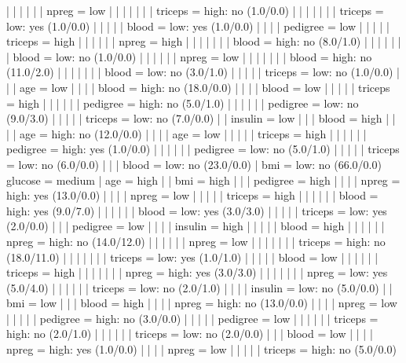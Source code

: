 |   |   |   |   |   |   npreg = low
|   |   |   |   |   |   |   triceps = high: no (1.0/0.0)
|   |   |   |   |   |   |   triceps = low: yes (1.0/0.0)
|   |   |   |   |   blood = low: yes (1.0/0.0)
|   |   |   |   pedigree = low
|   |   |   |   |   triceps = high
|   |   |   |   |   |   npreg = high
|   |   |   |   |   |   |   blood = high: no (8.0/1.0)
|   |   |   |   |   |   |   blood = low: no (1.0/0.0)
|   |   |   |   |   |   npreg = low
|   |   |   |   |   |   |   blood = high: no (11.0/2.0)
|   |   |   |   |   |   |   blood = low: no (3.0/1.0)
|   |   |   |   |   triceps = low: no (1.0/0.0)
|   |   |   age = low
|   |   |   |   blood = high: no (18.0/0.0)
|   |   |   |   blood = low
|   |   |   |   |   triceps = high
|   |   |   |   |   |   pedigree = high: no (5.0/1.0)
|   |   |   |   |   |   pedigree = low: no (9.0/3.0)
|   |   |   |   |   triceps = low: no (7.0/0.0)
|   |   insulin = low
|   |   |   blood = high
|   |   |   |   age = high: no (12.0/0.0)
|   |   |   |   age = low
|   |   |   |   |   triceps = high
|   |   |   |   |   |   pedigree = high: yes (1.0/0.0)
|   |   |   |   |   |   pedigree = low: no (5.0/1.0)
|   |   |   |   |   triceps = low: no (6.0/0.0)
|   |   |   blood = low: no (23.0/0.0)
|   bmi = low: no (66.0/0.0)
glucose = medium
|   age = high
|   |   bmi = high
|   |   |   pedigree = high
|   |   |   |   npreg = high: yes (13.0/0.0)
|   |   |   |   npreg = low
|   |   |   |   |   triceps = high
|   |   |   |   |   |   blood = high: yes (9.0/7.0)
|   |   |   |   |   |   blood = low: yes (3.0/3.0)
|   |   |   |   |   triceps = low: yes (2.0/0.0)
|   |   |   pedigree = low
|   |   |   |   insulin = high
|   |   |   |   |   blood = high
|   |   |   |   |   |   npreg = high: no (14.0/12.0)
|   |   |   |   |   |   npreg = low
|   |   |   |   |   |   |   triceps = high: no (18.0/11.0)
|   |   |   |   |   |   |   triceps = low: yes (1.0/1.0)
|   |   |   |   |   blood = low
|   |   |   |   |   |   triceps = high
|   |   |   |   |   |   |   npreg = high: yes (3.0/3.0)
|   |   |   |   |   |   |   npreg = low: yes (5.0/4.0)
|   |   |   |   |   |   triceps = low: no (2.0/1.0)
|   |   |   |   insulin = low: no (5.0/0.0)
|   |   bmi = low
|   |   |   blood = high
|   |   |   |   npreg = high: no (13.0/0.0)
|   |   |   |   npreg = low
|   |   |   |   |   pedigree = high: no (3.0/0.0)
|   |   |   |   |   pedigree = low
|   |   |   |   |   |   triceps = high: no (2.0/1.0)
|   |   |   |   |   |   triceps = low: no (2.0/0.0)
|   |   |   blood = low
|   |   |   |   npreg = high: yes (1.0/0.0)
|   |   |   |   npreg = low
|   |   |   |   |   triceps = high: no (5.0/0.0)
